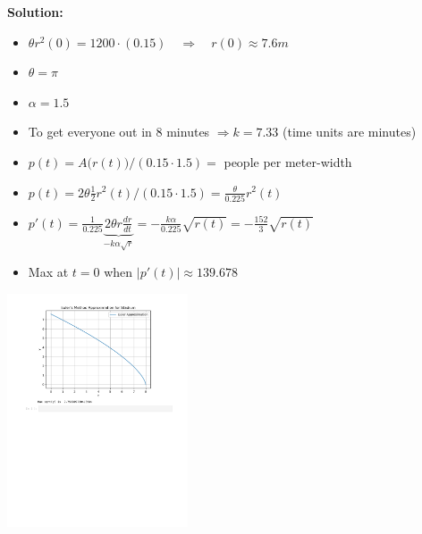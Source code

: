 \documentclass{workbook}
\begin{document}
\begin{solution}
\begin{slide}

\textbf{Solution:}

\begin{itemize}
\item $\theta r^2(0) = 1200 \cdot (0.15) \quad \Rightarrow \quad r(0) \approx 7.6m$
\item $\theta = \pi$
\item $\alpha = 1.5$
\item To get everyone out in 8 minutes $\Rightarrow k = 7.33$ (time units are minutes)
\item $p(t) = A\big(r(t)\big)/(0.15\cdot 1.5) = $ people per meter-width
\item $p(t) = 2\theta \frac12 r^2(t)/(0.15\cdot 1.5) = \frac{\theta}{0.225} r^2(t)$
\item $\displaystyle p'(t) = \frac{1}{0.225} \underbrace{2 \theta r\frac{dr}{dt}}_{- k \alpha \sqrt{r}} = -\frac{k \alpha}{0.225} \sqrt{r(t)} = - \frac{152}{3} \sqrt{r(t)}$ 
\item Max at $t=0$ when $|p'(t)| \approx 139.678$
\end{itemize}

\includegraphics[width=0.4\textwidth]{python/Stadium-Euler-ipynb.pdf}
	
\end{slide}	
\end{solution}
\end{document}
